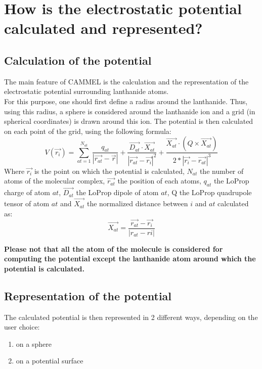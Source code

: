 \documentclass[12pt,a4paper]{article}
\begin{document}
\section{How is the electrostatic potential calculated and represented?}
\subsection{Calculation of the potential}
The main feature of CAMMEL is the calculation and the representation of the electrostatic potential surrounding lanthanide atoms.\\

For this purpose, one should first define a radius around the lanthanide. Thus, using this radius, a sphere is considered around the lanthanide ion and a grid (in spherical coordinates) is drawn around this ion. The potential is then calculated on each point of the grid, using the following formula:
\begin{equation}
V(\vec{r_i})=\sum_{at=1}^{N_{at}} \frac{q_{at}}{|\vec{r_{at}}-\vec{r}|} + \frac{\vec{D_{at}}\cdot{}\vec{X_{at}}}{|\vec{r_{at}}-\vec{r_i}|^2} + \frac{\vec{X_{at}}\cdot{}(Q\times\vec{X_{at}})}{2*|\vec{r_i}-\vec{r_{at}}|^3}
\end{equation}
Where $\vec{r_i}$ is the point on which the potential  is calculated, $N_{at}$ the number of atoms of the molecular complex, $\vec{r_{at}}$ the position of each atoms, $q_{at}$ the LoProp charge of atom $at$, $\vec{D_{at}}$ the LoProp dipole of atom $at$, Q the LoProp quadrupole tensor of atom $at$ and $\vec{X_{at}}$ the normalized distance between $i$ and $at$ calculated as:
\begin{equation}
\vec{X_{at}}=\frac{\vec{r_{at}}-\vec{r_i}}{|r_{{at}}-r{i}|}
\end{equation}

\textbf{Please not that all the atom of the molecule is considered for computing the potential except the lanthanide atom around which the potential is calculated.}

\subsection{Representation of the potential}
The calculated potential is then represented in 2 different ways, depending on the user choice:
\begin{enumerate}
\item{on a sphere}
\item{on a \og potential surface \fg{} } 
\end{enumerate}
\end{document}
